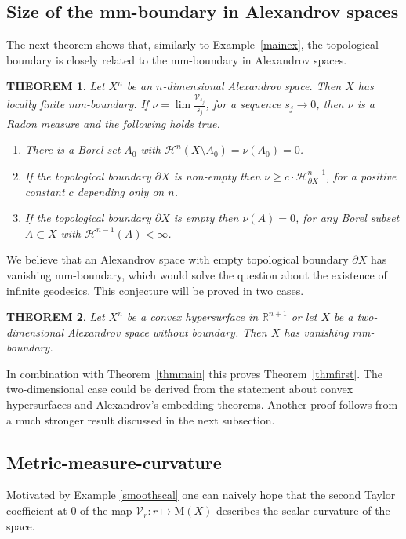 \documentclass[12pt,leqno,intlimits]{amsart}
\numberwithin{equation}{section}
\newtheorem{thm}{THEOREM}[section]
\theoremstyle{definition}
\theoremstyle{remark}
\newcommand{\tref}[1]{Theorem~\ref{#1}}
\newcommand{\exref}[1]{Example~\ref{#1}}
\newcommand{\R}{\mathbb{R}}
\begin{document}
\subsection{Size of the mm-boundary in Alexandrov spaces}
The next theorem shows that, similarly to \exref{mainex}, the topological boundary is closely related to the mm-boundary in Alexandrov spaces.

\begin{thm} \label{alexandrovthm}
Let $X^n$ be an $n$-dimensional Alexandrov space.
Then $X$ has locally finite mm-boundary.
If $ \nu= \lim \frac{\mathcal{V}_{s_j}}{s_j}$, for a sequence $s_j \to 0 $, then $\nu$ is a Radon measure and
the following holds true.
\begin{enumerate}
\item\label{full-measure-zero-nu}There is a Borel set $A_0$ with $\mathcal H^n (X\setminus A_0) = \nu (A_0)=0$.
\item\label{bry-nu} If the topological boundary $\partial X$ is non-empty then $\nu \geq c \cdot \mathcal H^{n-1} _{\partial X}$,
for a positive constant $c$ depending only on $n$.
\item \label{n-1-nu} If the topological boundary $\partial X$ is empty then $\nu (A)=0$, for any Borel subset $A\subset X$ with $\mathcal H^{n-1} (A)<\infty$.
\end{enumerate}
\end{thm}

We believe that an Alexandrov space with empty topological boundary $\partial X$ has vanishing mm-boundary,
which would solve the question about the existence of infinite geodesics.
This conjecture will be proved in two cases.

\begin{thm} \label{hypersurface}
Let $X^n$ be a convex hypersurface in $\R^{n+1}$ or let $X$ be a two-dimensional Alexandrov space without boundary.
Then $X$ has vanishing  mm-boundary.
\end{thm}

In combination with \tref{thmmain} this proves \tref{thmfirst}.
The two-dimensional case  could be derived  from the statement about convex hypersurfaces and Alexandrov's embedding theorems.
Another proof follows from a much stronger result discussed in the next subsection.

\subsection{Metric-measure-curvature} \label{subsec:curv}
Motivated by Example \ref{smoothscal} one can naively hope that the second Taylor coefficient at $0$ of the
map $\mathcal{V}_r\colon r\mapsto \mathrm M(X)$ describes the scalar curvature of the space.
\end{document}
